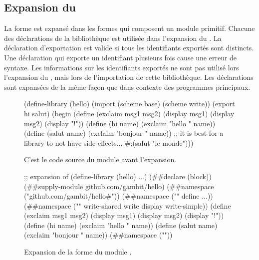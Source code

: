 \subsection{Expansion du }

La forme  est expansé dans les formes qui composent un
module primitif. Chacune des déclarations de la bibliothèque est utilisée dans
l'expansion du . La déclaration d'exportation est
valide si tous les identifiants exportés sont distincts. Une déclaration
 qui exporte un identifiant plusieurs fois cause une erreur de
syntaxe. Les informations sur les identifiants exportés ne sont pas utilisé lors
l'expansion du , mais lors de l'importation de cette
bibliothèque.  Les déclarations  sont expansées de la même
façon que dans contexte des programmes principaux.\\

\begin{figure}[ht]
  \centering
\begin{mplisting}{0.9}
(define-library (hello)
  (import (scheme base) (scheme write))
  (export hi salut)
  (begin
    (define (exclaim msg1 msg2)
      (display msg1)
      (display msg2)
      (display "!\n"))
    (define (hi name) (exclaim "hello " name))
    (define (salut name) (exclaim "bonjour " name))
    ;; it is best for a library to not have side-effects...
    #;(salut "le monde")))
\end{mplisting}
  \caption{C'est le code source du module
     avant l'expansion.}
  \label{fig:define-library->expand}
\end{figure}
  \vspace*{4ex}
\begin{figure}[ht]
  \centering
  \begin{mplisting}{0.9}
;; expansion of (define-library (hello) ...)
(##declare (block))
(##supply-module github.com/gambit/hello)
(##namespace ("github.com/gambit/hello#"))
(##namespace ("" define ...))
(##namespace ("" write-shared write display write-simple))
(define (exclaim msg1 msg2)
    (display msg1) (display msg2) (display "!\n"))
(define (hi name) (exclaim "hello " name))
(define (salut name) (exclaim "bonjour " name))
(##namespace (""))
\end{mplisting}
  \caption{Expansion de la forme 
    du module .}
  \label{fig:define-library->expand-after}
\end{figure}

